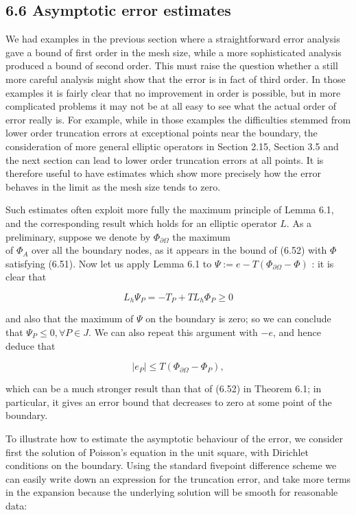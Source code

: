 \documentclass[10pt]{article}
\begin{document}
\subsection*{6.6 Asymptotic error estimates}
We had examples in the previous section where a straightforward error analysis gave a bound of first order in the mesh size, while a more sophisticated analysis produced a bound of second order. This must raise the question whether a still more careful analysis might show that the error is in fact of third order. In those examples it is fairly clear that no improvement in order is possible, but in more complicated problems it may not be at all easy to see what the actual order of error really is. For example, while in those examples the difficulties stemmed from lower order truncation errors at exceptional points near the boundary, the consideration of more general elliptic operators in Section 2.15, Section 3.5 and the next section can lead to lower order truncation errors at all points. It is therefore useful to have estimates which show more precisely how the error behaves in the limit as the mesh size tends to zero.

Such estimates often exploit more fully the maximum principle of Lemma 6.1, and the corresponding result which holds for an elliptic operator \(L\). As a preliminary, suppose we denote by \(\Phi_{\partial \Omega}\) the maximum\\
of \(\Phi_{A}\) over all the boundary nodes, as it appears in the bound of (6.52) with \(\Phi\) satisfying (6.51). Now let us apply Lemma 6.1 to \(\Psi:=e- T\left(\Phi_{\partial \Omega}-\Phi\right)\) : it is clear that

\[
L_{h} \Psi_{P}=-T_{P}+T L_{h} \Phi_{P} \geq 0
\]

and also that the maximum of \(\Psi\) on the boundary is zero; so we can conclude that \(\Psi_{P} \leq 0, \forall P \in J\). We can also repeat this argument with \(-e\), and hence deduce that

\[
\left|e_{P}\right| \leq T\left(\Phi_{\partial \Omega}-\Phi_{P}\right),
\]

which can be a much stronger result than that of (6.52) in Theorem 6.1; in particular, it gives an error bound that decreases to zero at some point of the boundary.

To illustrate how to estimate the asymptotic behaviour of the error, we consider first the solution of Poisson's equation in the unit square, with Dirichlet conditions on the boundary. Using the standard fivepoint difference scheme we can easily write down an expression for the truncation error, and take more terms in the expansion because the underlying solution will be smooth for reasonable data:
\end{document}
